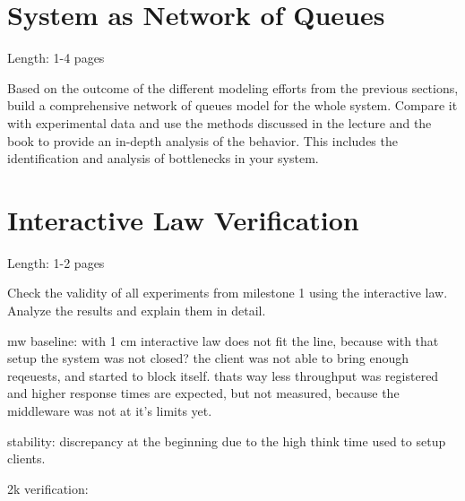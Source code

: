 \documentclass[11pt]{article}
\begin{document}
\section{System as Network of Queues}\label{sec:network-of-queues}

Length: 1-4 pages

Based on the outcome of the different modeling efforts from the previous sections, build a comprehensive network of queues model for the whole system. Compare it with experimental data and use the methods discussed in the lecture and the book to provide an in-depth analysis of the behavior. This includes the identification and analysis of bottlenecks in your system.

\section{Interactive Law Verification}\label{sec:interactive-law}

Length: 1-2 pages

Check the validity of all experiments from milestone 1 using the interactive law. Analyze the results and explain them in detail.

mw baseline: with 1 cm interactive law does not fit the line, because with that setup the system was not closed? the client was not able to bring enough reqeuests, and started to block itself. thats way less throughput was registered and higher response times are expected, but not measured, because the middleware was not at it's limits yet.

stability: discrepancy at the beginning due to the high think time used to setup clients.

2k verification:
\end{document}
